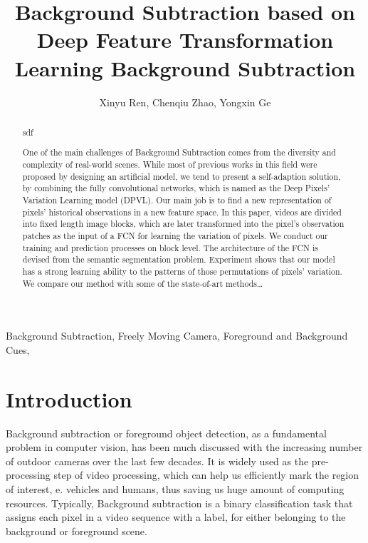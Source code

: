 \documentclass[journal]{IEEEtran}
\begin{document}
\title{Background Subtraction based on Deep Feature Transformation Learning Background Subtraction}

\author{Xinyu Ren,
        Chenqiu Zhao,
		Yongxin Ge }


\maketitle


\begin{abstract}
    sdf

One of the main challenges of Background Subtraction comes from the diversity and complexity of real-world scenes.
While most of previous works in this field were proposed by designing an artificial model, we tend to present a self-adaption solution, by combining the fully convolutional networks, which is named as the Deep Pixels’ Variation Learning model (DPVL).
Our main job is to find a new representation of pixels’ historical observations in a new feature space.
In this paper, videos are divided into fixed length image blocks, which are later transformed into the pixel’s observation patches as the input of a FCN for learning the variation of pixels.
We conduct our training and prediction processes on block level.
The architecture of the FCN is devised from the semantic segmentation problem.
Experiment shows that our model has a strong learning ability to the patterns of those permutations of pixels’ variation.
We compare our method with some of the state-of-art methods… 
\end{abstract}

\begin{IEEEkeywords} 
    Background Subtraction, Freely Moving Camera, Foreground and Background Cues,
\end{IEEEkeywords}

\IEEEpeerreviewmaketitle

\section{Introduction}
Background subtraction or foreground object detection, as a fundamental problem in computer vision, has been much discussed with the increasing number of outdoor cameras over the last few decades.
It is widely used as the pre-processing step of video processing, which can help us efficiently mark the region of interest, e.
vehicles and humans, thus saving us huge amount of computing resources.
Typically, Background subtraction is a binary classification task that assigns each pixel in a video sequence with a label, for either belonging to the background or foreground scene.
\end{document}
